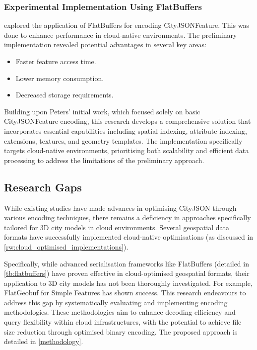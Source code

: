 \subsubsection{Experimental Implementation Using FlatBuffers}
\label{rw:cityjson_enhancements:performance:flatbuffers}

\citet{ravi_peters_2024_citybuf} explored the application of FlatBuffers \citep{flatbuffers} for encoding CityJSONFeature.
This was done to enhance performance in cloud-native environments.
The preliminary implementation revealed potential advantages in several key areas:

\begin{itemize}
  \item Faster feature access time.
  \item Lower memory consumption.
  \item Decreased storage requirements.
\end{itemize}

Building upon Peters' initial work, which focused solely on basic CityJSONFeature encoding, this research develops a comprehensive solution that incorporates essential capabilities including spatial indexing, attribute indexing, extensions, textures, and geometry templates. The implementation specifically targets cloud-native environments, prioritising both scalability and efficient data processing to address the limitations of the preliminary approach.

\subsection{Research Gaps}
\label{rw:research_gaps}

While existing studies have made advances in optimising CityJSON through various encoding techniques, there remains a deficiency in approaches specifically tailored for 3D city models in cloud environments.
Several geospatial data formats have successfully implemented cloud-native optimisations (as discussed in \autoref{rw:cloud_optimised_implementations}).

Specifically, while advanced serialisation frameworks like FlatBuffers (detailed in \autoref{tb:flatbuffers}) have proven effective in cloud-optimised geospatial formats, their application to 3D city models has not been thoroughly investigated.
For example, FlatGeobuf for Simple Features \citep{flatgeobuf} has shown success.
This research endeavours to address this gap by systematically evaluating and implementing encoding methodologies. These methodologies aim to enhance decoding efficiency and query flexibility within cloud infrastructures, with the potential to achieve file size reduction through optimised binary encoding. The proposed approach is detailed in \autoref{methodology}.

